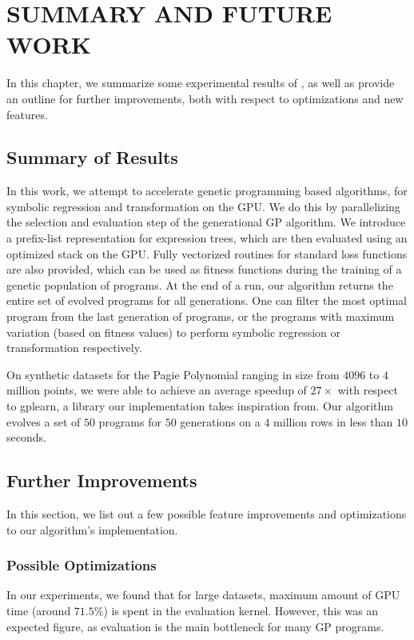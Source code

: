 \chapter{SUMMARY AND FUTURE WORK}
\label{chap:conclusion}
In this chapter, we summarize some experimental results of , as well as provide an outline for further improvements, both with respect to optimizations and new features.

\section{Summary of Results}
\label{sec:summary}
In this work, we attempt to accelerate genetic programming based algorithms, for symbolic regression and transformation on the GPU. We do this by parallelizing the selection and evaluation step of the generational GP algorithm. We introduce a prefix-list representation for expression trees, which are then evaluated using an optimized stack on the GPU. Fully vectorized routines for standard loss functions are also provided, which can be used as fitness functions during the training of a genetic population of programs. At the end of a run, our algorithm returns the entire set of evolved programs for all generations. One can filter the most optimal program from the last generation of programs, or the programs with maximum variation (based on fitness values) to perform symbolic regression or transformation respectively. 

On synthetic datasets for the Pagie Polynomial ranging in size from $4096$ to $4$ million points, we were able to achieve an average speedup of $27\times$ with respect to gplearn\citep{gplearn}, a library our implementation takes inspiration from. Our algorithm evolves a set of $50$ programs for $50$ generations on a $4$ million rows in less than $10$ seconds. 

\section{Further Improvements}
\label{sec:improvements}
In this section, we list out a few possible feature improvements and optimizations to our algorithm's implementation.

\subsection{Possible Optimizations}
\label{subsec:optimizations}
In our experiments, we found that for large datasets, maximum amount of GPU time (around $71.5\%$) is spent in the evaluation kernel. However, this was an expected figure, as evaluation is the main bottleneck for many GP programs. 

